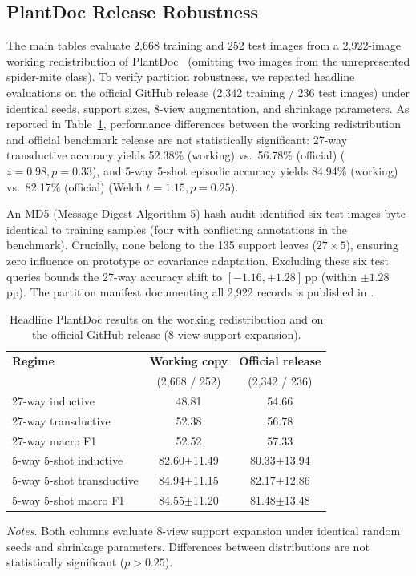 \subsection{PlantDoc Release Robustness}
\label{app:plantdoc_official}
The main tables evaluate 2{,}668 training and 252 test images from a 2{,}922-image working redistribution of PlantDoc~\cite{singh2020plantdoc} (omitting two images from the unrepresented spider-mite class). To verify partition robustness, we repeated headline evaluations on the official GitHub release (2{,}342 training / 236 test images) under identical seeds, support sizes, 8-view augmentation, and shrinkage parameters. As reported in Table~\ref{tab:plantdoc_official}, performance differences between the working redistribution and official benchmark release are not statistically significant: 27-way transductive accuracy yields 52.38\% (working) vs.\ 56.78\% (official) ($z=0.98, p=0.33$), and 5-way 5-shot episodic accuracy yields 84.94\% (working) vs.\ 82.17\% (official) (Welch $t=1.15, p=0.25$).

An MD5 (Message Digest Algorithm 5) hash audit identified six test images byte-identical to training samples (four with conflicting annotations in the benchmark). Crucially, none belong to the 135 support leaves ($27 \times 5$), ensuring zero influence on prototype or covariance adaptation. Excluding these six test queries bounds the 27-way accuracy shift to $[-1.16, +1.28]$\,pp (within $\pm1.28$\,pp). The partition manifest documenting all 2{,}922 records is published in .

\begin{table}[htbp]
\caption{Headline PlantDoc results on the working redistribution and on the official GitHub release (8-view support expansion).}
\label{tab:plantdoc_official}
\centering
\footnotesize
\setlength{\tabcolsep}{4pt}
\begin{tabular*}{\columnwidth}{@{\extracolsep{\fill}}lcc}
\toprule
\textbf{Regime} & \textbf{Working copy} & \textbf{Official release} \\
 & (2{,}668 / 252) & (2{,}342 / 236) \\
\midrule
27-way inductive & 48.81 & 54.66 \\
27-way transductive & 52.38 & 56.78 \\
27-way macro F1 & 52.52 & 57.33 \\
5-way 5-shot inductive & 82.60$\pm$11.49 & 80.33$\pm$13.94 \\
5-way 5-shot transductive & 84.94$\pm$11.15 & 82.17$\pm$12.86 \\
5-way 5-shot macro F1 & 84.55$\pm$11.20 & 81.48$\pm$13.48 \\
\bottomrule
\end{tabular*}

\vspace{3pt}
\begin{minipage}{\columnwidth}
\footnotesize
\textit{Notes.} Both columns evaluate 8-view support expansion under identical random seeds and shrinkage parameters. Differences between distributions are not statistically significant ($p > 0.25$).
\end{minipage}
\end{table}

